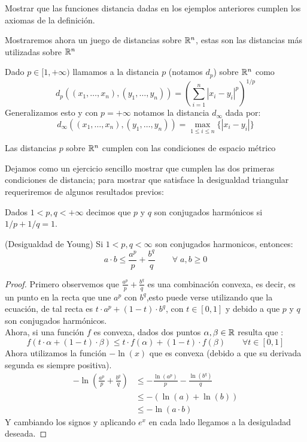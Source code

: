 \documentclass[12pt,a4paper]{book}
\begin{document}
\begin{ej} Mostrar que las funciones distancia dadas en los ejemplos anteriores cumplen los axiomas de la definición.\end{ej}
Mostraremos ahora un juego de distancias sobre $\mathbb{R}^n$, estas son las distancias más utilizadas sobre $\mathbb{R}^n$
\begin{defi} Dado $p \in [1, +\infty)$ llamamos a la distancia $p$ (notamos $d_p$) sobre $\mathbb{R}^n$ como 
$$d_p((x_1, \ldots, x_n), (y_1, \ldots, y_n)) = \left( \sum_{i = 1}^n |x_i - y_i|^p \right)^{1/p}$$
Generalizamos esto y con $p = +\infty$ notamos la distancia $d_\infty$ dada por:
$$ d_\infty((x_1, \ldots, x_n), (y_1, \ldots, y_n))= \max_{1 \leq i \leq n} \{ | x_i - y_i |\}$$
\end{defi}
\begin{prop} Las distancias $p$ sobre $\mathbb{R}^n$ cumplen con las condiciones de espacio métrico \end{prop}
Dejamos como un ejercicio sencillo mostrar que cumplen las dos primeras condiciones de distancia; para mostrar que satisface la desigualdad triangular requeriremos de algunos resultados previos:
\begin{defi} Dados $ 1 < p,q < +\infty$ decimos que $p$ y $q$ son conjugados harmónicos si $1/p + 1/q =1$.\end{defi}
\begin{lem}(Desigualdad de Young)
Si $1 < p,q < \infty$ son conjugados harmonicos, entonces:
$$ a \cdot b \leq \frac{a^p}{p} + \frac{b^q}{q} \qquad \forall \; a,b \geq 0$$
\begin{proof}
Primero observemos que  $\displaystyle \frac{a^p}{p} + \frac{b^q}{q}$ es una combinación convexa, es decir, es un punto en la recta que une $a^p$ con $b^q$,esto puede verse utilizando que la ecuación, de tal recta es $ t \cdot a^p + (1- t) \cdot b^q$, con $t \in [0,1]$ y debido a que $p$ y $q$ son conjugados harmónicos.\\
Ahora, si una función $f$ es convexa, dados dos puntos $\alpha,\beta \in \mathbb{R}$ resulta que :
$$ f(t \cdot \alpha + (1-t) \cdot \beta ) \leq t \cdot f(\alpha) + (1-t) \cdot f(\beta) \qquad \forall t \in [0,1]$$
Ahora utilizamos la función $ -\ln(x)$ que es convexa (debido a que su derivada segunda es siempre positiva).
\begin{align*}
-\ln \left(\frac{a^p}{p} + \frac{b^q}{q}\right) &\leq -\frac{\ln(a^p)}{p} - \frac{\ln(b^q)}{q} \\
&\leq -(\ln (a) + \ln(b))\\
&\leq - \ln(a \cdot b)
\end{align*}
Y cambiando los signos y aplicando $e^x$ en cada lado llegamos a la desiguladad deseada.
\end{proof}
\end{lem}
\end{document}

